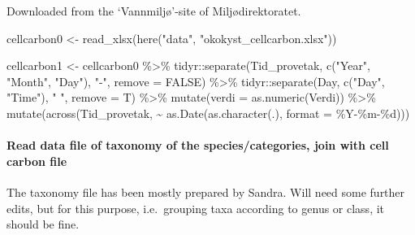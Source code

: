 \documentclass[
]{article}
\newenvironment{Shaded}{\begin{snugshade}}{\end{snugshade}}
\newcommand{\AttributeTok}[1]{\textcolor[rgb]{0.77,0.63,0.00}{#1}}
\newcommand{\ConstantTok}[1]{\textcolor[rgb]{0.00,0.00,0.00}{#1}}
\newcommand{\FunctionTok}[1]{\textcolor[rgb]{0.00,0.00,0.00}{#1}}
\newcommand{\NormalTok}[1]{#1}
\newcommand{\OtherTok}[1]{\textcolor[rgb]{0.56,0.35,0.01}{#1}}
\newcommand{\SpecialCharTok}[1]{\textcolor[rgb]{0.00,0.00,0.00}{#1}}
\newcommand{\StringTok}[1]{\textcolor[rgb]{0.31,0.60,0.02}{#1}}
\begin{document}
Downloaded from the `Vannmiljø'-site of Miljødirektoratet.

\begin{Shaded}
\begin{Highlighting}[]
\NormalTok{cellcarbon0 }\OtherTok{\textless{}{-}} \FunctionTok{read\_xlsx}\NormalTok{(}\FunctionTok{here}\NormalTok{(}\StringTok{"data"}\NormalTok{, }\StringTok{"okokyst\_cellcarbon.xlsx"}\NormalTok{)) }

\NormalTok{cellcarbon1 }\OtherTok{\textless{}{-}}\NormalTok{ cellcarbon0 }\SpecialCharTok{\%\textgreater{}\%}\NormalTok{ tidyr}\SpecialCharTok{::}\FunctionTok{separate}\NormalTok{(Tid\_provetak, }\FunctionTok{c}\NormalTok{(}\StringTok{"Year"}\NormalTok{, }\StringTok{"Month"}\NormalTok{, }\StringTok{"Day"}\NormalTok{), }\StringTok{"{-}"}\NormalTok{, }\AttributeTok{remove =} \ConstantTok{FALSE}\NormalTok{) }\SpecialCharTok{\%\textgreater{}\%} 
\NormalTok{  tidyr}\SpecialCharTok{::}\FunctionTok{separate}\NormalTok{(Day, }\FunctionTok{c}\NormalTok{(}\StringTok{"Day"}\NormalTok{, }\StringTok{"Time"}\NormalTok{), }\StringTok{" "}\NormalTok{, }\AttributeTok{remove =}\NormalTok{ T) }\SpecialCharTok{\%\textgreater{}\%} \FunctionTok{mutate}\NormalTok{(}\AttributeTok{verdi =} \FunctionTok{as.numeric}\NormalTok{(Verdi)) }\SpecialCharTok{\%\textgreater{}\%} 
    \FunctionTok{mutate}\NormalTok{(}\FunctionTok{across}\NormalTok{(Tid\_provetak, }\SpecialCharTok{\textasciitilde{}} \FunctionTok{as.Date}\NormalTok{(}\FunctionTok{as.character}\NormalTok{(.), }\AttributeTok{format =} \StringTok{\textquotesingle{}\%Y{-}\%m{-}\%d\textquotesingle{}}\NormalTok{)))}
\end{Highlighting}
\end{Shaded}

\hypertarget{read-data-file-of-taxonomy-of-the-speciescategories-join-with-cell-carbon-file}{%
\paragraph{Read data file of taxonomy of the species/categories, join
with cell carbon
file}\label{read-data-file-of-taxonomy-of-the-speciescategories-join-with-cell-carbon-file}}

The taxonomy file has been mostly prepared by Sandra. Will need some
further edits, but for this purpose, i.e.~grouping taxa according to
genus or class, it should be fine.
\end{document}
